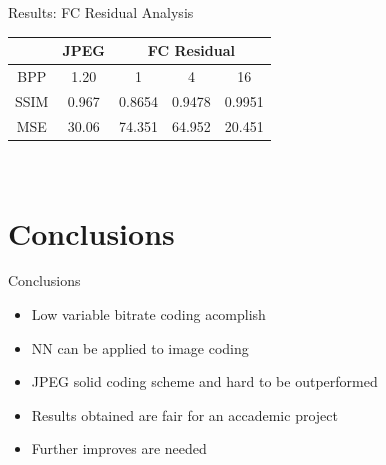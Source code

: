\documentclass[10pt]{beamer}
\begin{document}
\begin{frame}{Results: FC Residual Analysis}
\begin{center}
{\begin{tabular}{|c||c||c|c|c|}
  \hline
& JPEG  & \multicolumn{3}{c|}{FC Residual}\\
  \hline
  \hline
BPP & 1.20 & 1 & 4 & 16 \\
  \hline
SSIM & 0.967 & 0.8654 & 0.9478  & 0.9951 \\
\hline
MSE & 30.06 & 74.351 & 64.952  & 20.451 \\
\hline
\end{tabular}%
}
\end{center}
\vspace{10mm}
\begin{figure}
  \begin{minipage}{\textwidth}
           \\
  \end{minipage}
\end{figure}
  \end{frame}





  \begingroup
  \section{Conclusions}
  \endgroup

  \begin{frame}{Conclusions}
    \begin{itemize}
      \item Low variable bitrate coding acomplish
      \item NN can be applied to image coding
      \item JPEG solid coding scheme and hard to be outperformed
      \item Results obtained are fair for an accademic project
      \item Further improves are needed
    \end{itemize}
  \end{frame}





\maketitle
\end{document}
